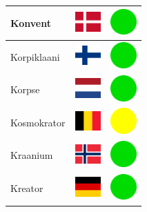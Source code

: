 \documentclass[12pt, a4paper, twoside]{report}
\begin{document}
\begin{center}
\begin{longtable}{|p{5cm}|p{2cm}|p{2cm}|}
 Konvent                                                    & \includegraphics[width=1cm]{../img/flags/dk} &   \includegraphics[width=1cm]{../likes/y} \\ \hline
 Korpiklaani                                                & \includegraphics[width=1cm]{../img/flags/fi} &   \includegraphics[width=1cm]{../likes/y} \\ \hline
 Korpse                                                     & \includegraphics[width=1cm]{../img/flags/nl} &   \includegraphics[width=1cm]{../likes/y} \\ \hline
 Kosmokrator                                                & \includegraphics[width=1cm]{../img/flags/be} &   \includegraphics[width=1cm]{../likes/m} \\ \hline
 Kraanium                                                   & \includegraphics[width=1cm]{../img/flags/no} &   \includegraphics[width=1cm]{../likes/y} \\ \hline
 Kreator                                                    & \includegraphics[width=1cm]{../img/flags/de} &   \includegraphics[width=1cm]{../likes/y} \\ \hline

\end{longtable}
\end{center}
\end{document}
